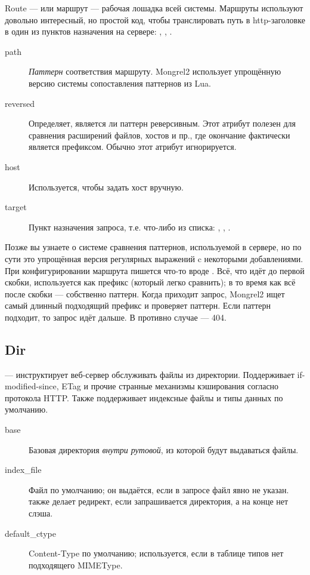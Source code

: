Route --- или маршрут --- рабочая лошадка всей системы. Маршруты
используют довольно интересный, но простой код, чтобы транслировать
путь в http-заголовке в один из пунктов назначения на сервере:
, , .

\begin{description}
\item[path] \emph{Паттерн} соответствия маршруту. Mongrel2 использует
    упрощённую версию системы сопоставления паттернов из Lua.
\item[reversed] Определяет, является ли паттерн реверсивным. Этот
    атрибут полезен для сравнения расширений файлов, хостов и пр., где
    окончание фактически является префиксом. Обычно этот атрибут игнорируется.
\item[host] Используется, чтобы задать хост вручную.
\item[target] Пункт назначения запроса, т.е. что-либо из списка:
, , .
\end{description}

Позже вы узнаете о системе сравнения паттернов, используемой в
сервере, но по сути это упрощённая версия регулярных выражений c
некоторыми добавлениями. При конфигурировании маршрута пишется
что-то вроде . Всё, что идёт до первой скобки,
используется как префикс (который легко сравнить); в то время как всё
после скобки --- собственно паттерн. Когда приходит запрос, Mongrel2
ищет самый длинный подходящий префикс и проверяет паттерн. Если
паттерн подходит, то запрос идёт дальше. В противно случае --- 404.

\subsection{Dir}

 --- инструктирует веб-сервер обслуживать файлы из
директории. Поддерживает if-modified-since, ETag и прочие странные
механизмы кэширования согласно протокола HTTP. Также поддерживает
индексные файлы и типы данных по умолчанию.

\begin{description}
\item[base] Базовая директория \emph{внутри рутовой}, из которой будут
    выдаваться файлы.
\item[index\_file] Файл по умолчанию; он выдаётся, если в запросе файл явно
    не указан.  также делает редирект, если запрашивается
    директория, а на конце нет слэша.
\item[default\_ctype] Content-Type по умолчанию; используется, если в
    таблице типов нет подходящего MIMEType.
\end{description}


